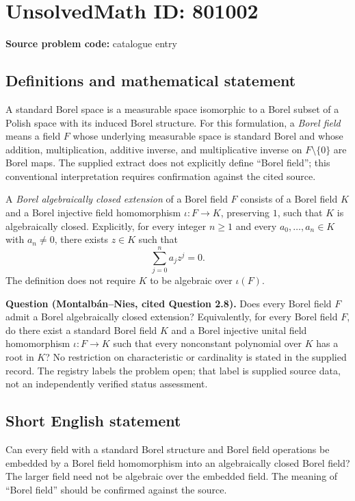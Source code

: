 \documentclass[11pt]{article}
\begin{document}
\section*{UnsolvedMath ID: 801002}
\textbf{Source problem code:} catalogue entry
\subsection{Definitions and mathematical statement}
A standard Borel space is a measurable space isomorphic to a Borel subset of a Polish space with its induced Borel structure. For this formulation, a \emph{Borel field} means a field \(F\) whose underlying measurable space is standard Borel and whose addition, multiplication, additive inverse, and multiplicative inverse on \(F\setminus\{0\}\) are Borel maps. The supplied extract does not explicitly define ``Borel field''; this conventional interpretation requires confirmation against the cited source.

A \emph{Borel algebraically closed extension} of a Borel field \(F\) consists of a Borel field \(K\) and a Borel injective field homomorphism \(\iota:F\to K\), preserving \(1\), such that \(K\) is algebraically closed. Explicitly, for every integer \(n\geq 1\) and every \(a_0,\ldots,a_n\in K\) with \(a_n\neq 0\), there exists \(z\in K\) such that
\[
\sum_{j=0}^{n}a_jz^j=0.
\]
The definition does not require \(K\) to be algebraic over \(\iota(F)\).

\textbf{Question (Montalb\'an--Nies, cited Question 2.8).} Does every Borel field \(F\) admit a Borel algebraically closed extension? Equivalently, for every Borel field \(F\), do there exist a standard Borel field \(K\) and a Borel injective unital field homomorphism \(\iota:F\to K\) such that every nonconstant polynomial over \(K\) has a root in \(K\)? No restriction on characteristic or cardinality is stated in the supplied record. The registry labels the problem open; that label is supplied source data, not an independently verified status assessment.
\subsection{Short English statement}
Can every field with a standard Borel structure and Borel field operations be embedded by a Borel field homomorphism into an algebraically closed Borel field? The larger field need not be algebraic over the embedded field. The meaning of ``Borel field'' should be confirmed against the source.
\end{document}
